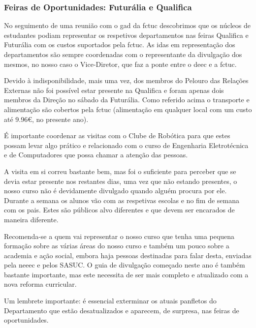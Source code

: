 
\subsubsection{Feiras de Oportunidades: Futurália e Qualifica}

No seguimento de uma reunião com o \acrfull{gad} da \acrshort{fctuc} descobrimos que os núcleos de estudantes podiam representar os respetivos departamentos nas feiras Qualifica e Futurália com os custos suportados pela \acrshort{fctuc}. As idas em representação dos departamentos são sempre coordenadas com o representante da divulgação dos mesmos, no nosso caso o Vice-Diretor, que faz a ponte entre o \acrshort{deec} e a \acrshort{fctuc}.

Devido à indisponibilidade, mais uma vez, dos membros do Pelouro das Relações Externas não foi possível estar presente na Qualifica e foram apenas dois membros da Direção no sábado da Futurália. Como referido acima o transporte e alimentação são cobertos pela \acrshort{fctuc} (alimentação em qualquer local com um custo até 9.96€, no presente ano).

É importante coordenar as visitas com o Clube de Robótica para que estes possam levar algo prático e relacionado com o curso de Engenharia Eletrotécnica e de Computadores que possa chamar a atenção das pessoas.

A visita em si correu bastante bem, mas foi o suficiente para perceber que se devia estar presente nos restantes dias, uma vez que não estando presentes, o nosso curso não é devidamente divulgado quando alguém procura por ele. Durante a semana os alunos vão com as respetivas escolas e no fim de semana com os pais. Estes são públicos alvo diferentes e que devem ser encarados de maneira diferente.

Recomenda-se a quem vai representar o nosso curso que tenha uma pequena formação sobre as várias áreas do nosso curso e também um pouco sobre a academia e ação social, embora haja pessoas destinadas para falar desta, enviadas pela \acrshort{neeec} e pelos SASUC. O guia de divulgação começado neste ano é também bastante importante, mas este necessita de ser mais completo e atualizado com a nova reforma curricular.

Um lembrete importante: é essencial exterminar os atuais panfletos do Departamento que estão desatualizados e aparecem, de surpresa, nas feiras de oportunidades.